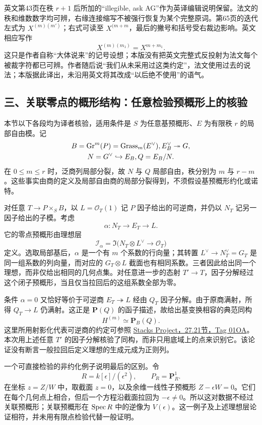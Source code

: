 英文第43页在秩 $r+1$ 后所加的“illegible, ask AG”作为英译编辑说明保留。法文的秩和维数数字均可辨，右缘连接缩写不被强行恢复为某个完整原词。第65页的迭代左式为 $X^{(m)(m')}$；右式可读至 $X^{(m+m}$，最后的撇号和括号受右裁边影响。英文相应写作
\[
X^{(m)(m_1)}=X^{m+m_1}.
\]
这只是作者自称“大体说来”的记号设想；本版没有把英文完整式反投射为法文每个被裁字符都已可辨。作者随后说“我们从未采用过这类约定”，法文使用过去的说法；本版据此译出，未沿用英文将其改成“以后绝不使用”的语气。

\subsection*{三、关联零点的概形结构：任意检验预概形上的核验}

本节以下各段均为译者核验，适用条件是 $S$ 为任意基预概形、$E$ 为有限秩 $r$ 的局部自由模。记
\[
\begin{gathered}
B=\operatorname{Gr}^m(P)=\operatorname{Grass}_m(E^\vee), E_B^\vee\twoheadrightarrow G,\\
N=G^\vee\hookrightarrow E_B, Q=E_B/N.
\end{gathered}
\]
在 $0\leq m\leq r$ 时，泛商列局部分裂，故 $N$ 与 $Q$ 局部自由，秩分别为 $m$ 与 $r-m$。这些事实由商的定义及局部自由商的局部分裂得到，不须假设基预概形约化或诺特。

对任意 $T\to P\times_S B$，以 $L=\mathcal O_T(1)$ 记 $P$ 因子给出的可逆商，并仍以 $N_T$ 记另一因子给出的子模。考虑
\[
\alpha:N_T\longrightarrow E_T\longrightarrow L.
\]
它的零点预概形由理想层
\[
\mathcal I_\alpha=
\Im\bigl(N_T\otimes L^\vee\longrightarrow\mathcal O_T\bigr)
\]
定义。选取局部基后，$\alpha$ 是一个有 $m$ 个系数的行向量；其转置 $L^\vee\to N_T^\vee=G_T$ 是同一组系数的列向量，而对应的 $G_T\otimes L$ 截面也有相同系数。三者因此给出同一个理想，而非仅给出相同的几何点集。对任意进一步的态射 $T'\to T$，因子分解经过这个闭子预概形，当且仅当拉回后的这组系数全部为零。

条件 $\alpha=0$ 又恰好等价于可逆商 $E_T\twoheadrightarrow L$ 经由 $Q_T$ 因子分解。由于原商满射，所得 $Q_T\to L$ 仍满射。这正是 $\mathbf P(Q)$ 的函子描述，故给出基变换相容的典范同构
\[
H^{(m)}\simeq\mathbf P_B(Q).
\]
这里所用射影化代表可逆商的约定可参照
\href{https://stacks.math.columbia.edu/tag/01OA}{Stacks Project，27.21节，Tag 01OA}。
本次用上述任意 $T'$ 的因子分解核验了同构，而非只用底域上的点来识别它。该论证没有断言一般拉回后定义理想的生成元成为正则列。

一个可直接检验的非约化例子说明最后的区别。令
\[
R=k[\epsilon]/(\epsilon^2),\qquad P_R=\mathbf P^1_R.
\]
在坐标 $z=Z/W$ 中，取截面 $z=0$，以及余维一线性子预概形 $Z-\epsilon W=0$。它们在每个几何点上相合，但后一个方程沿截面拉回为 $-\epsilon\ne0$。所以这对数据不经过关联预概形；关联预概形在 $\operatorname{Spec} R$ 中的逆像为 $V(\epsilon)$。这一例子及上述理想层论证相符，并未用有限点检验代替一般证明。

